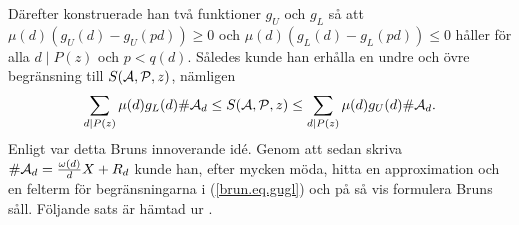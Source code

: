 Därefter konstruerade han två funktioner $g_U$ och $g_L$ så att $\mu(d)(g_U(d)-g_U(pd))\geq0$ och $\mu(d)(g_L(d)-g_L(pd))\leq0$ håller för alla $d \mid P(z)$ och $p<q(d)$.
Således kunde han erhålla en undre och övre begränsning till $\S{A}{P}{z}$, nämligen
\begin{equation}\label{brun.eq.gugl}
    \sum_{d \mid P(z)} \mu(d) g_L(d) \card\A_d 
    \leq \S{A}{P}{z} 
    \leq \sum_{d \mid P(z)} \mu(d) g_U(d) \card\A_d.
\end{equation}
Enligt \cite{cojocarumurty} var detta Bruns innoverande idé.
Genom att sedan skriva $\card\A_d=\frac{\omega(d)}{d}X + R_d$ kunde han, efter mycken möda, hitta en approximation och en felterm för begränsningarna i (\ref{brun.eq.gugl}) och på så vis formulera Bruns såll. Följande sats är hämtad ur \cite[Kap. 6.2]{cojocarumurty}.



\begin{comment}
Vi nöjer oss med att beskriva huvudidéen bakom sållet med stöd i \cite[kap 6.2]{cojocarumurty}. %

Viggo Brun bevisade att för varje funktion $g$ så att $g(1)=1$, gäller det att
\begin{equation*}
    \sum_{d \mid P(z)} \mu(d) g(d) \card\A_d = \S{A}{P}{z} + G(\A,\P,z),
\end{equation*} %
där $G$ är en funktion av $\A,\P$ och $z$, explicit definierad med hjälp av $g$.
Därefter hittade Brun ytterligare krav på funktionen $g$ så att $G\leq0$ eller $G\geq0$ alltid gäller. 
Således kunde en undre och övre begränsning till $\S{A}{P}{z}$ erhållas.
Mer specifikt, tag två funktioner $g_U$ och $g_L$ som uppfyller
\begin{align*}
    g_U=g_L=1,\\
    \mu(d)(g_U(d)-g_U(pd)) &\geq 0,\\
    \mu(d)(g_L(d)-g_L(pd)) &\leq 0,
\end{align*}
för alla kvadratfria tal $d$ och $p<q$ för alla $q\mid d$. Då gäller det att
\begin{equation}\label{brun.eq.gugl}
    \sum_{d \mid P(z)} \mu(d) g_L(d) \card\A_d 
    \leq \S{A}{P}{z} 
    \leq \sum_{d \mid P(z)} \mu(d) g_U(d) \card\A_d.
\end{equation}
Enligt \cite{cojocarumurty} var detta Bruns innovativa idé. %
Genom att sedan skriva $\card\A_d=\frac{\omega(d)}{d}X + R_d$ kunde han, efter mycket möda, hitta en approximation och en felterm för begränsningarna i (\ref{brun.eq.gugl}) och på så vis formulera Bruns såll. Följande sats är hämtad ur \cite[Kap. 6.2]{cojocarumurty}.
\end{comment}


